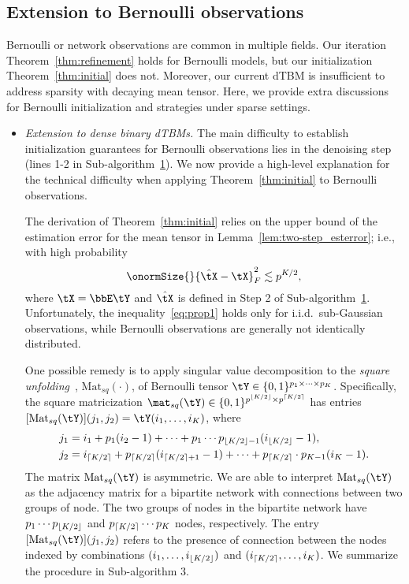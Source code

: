 \documentclass[lettersize,onecolumn,journal]{IEEEtran}
\theoremstyle{definition}
\theoremstyle{definition}
\newcommand{\Mat}{\text{Mat}}
\DeclarePairedDelimiter{\ceil}{\lceil}{\rceil}
\DeclarePairedDelimiter{\floor}{\lfloor}{\rfloor}
\begin{document}
{
  

\subsection{Extension to Bernoulli observations}\label{subsec:ber}

Bernoulli or network observations are common in multiple fields. Our iteration Theorem~\ref{thm:refinement} holds for Bernoulli models, but our initialization Theorem~\ref{thm:initial} does not. Moreover, our current dTBM is insufficient to address sparsity with decaying mean tensor. Here, we provide extra discussions for Bernoulli initialization and strategies under sparse settings.

\begin{itemize}[wide]
    \item \textit{Extension to dense binary dTBMs.} The main difficulty to establish initialization guarantees for Bernoulli observations lies in the denoising step (lines 1-2 in Sub-algorithm~\hyperref[alg:main]{1}). We now provide a high-level explanation for the technical difficulty when applying Theorem~\ref{thm:initial} to Bernoulli observations. 
    
    
    The derivation of Theorem~\ref{thm:initial} relies on the upper bound of the estimation error for the mean tensor in Lemma~\ref{lem:two-step_esterror}; i.e., with high probability
\begin{equation}\label{eq:prop1}
    \onormSize{}{\hat \tX - \tX}_F^2 \lesssim p^{K/2},
\end{equation}
where $\tX = \bbE\tY$ and $\hat \tX$ is defined in Step 2 of Sub-algorithm~\hyperref[alg:main]{1}. Unfortunately, the inequality~\eqref{eq:prop1} holds only for i.i.d.\ sub-Gaussian observations, while Bernoulli observations are generally not identically distributed.  

{
\color{blue}

One possible remedy is to apply singular value decomposition to the \emph{square unfolding}~\citep{mu2014square}, $\Mat_{sq}(\cdot)$, of Bernoulli tensor $\tY \in \{0,1\}^{p_1 \times \cdots \times p_K}$. Specifically, the square matricization $\mat_{sq} (\tY) \in \{0,1\}^{p^{\floor{K/2}} \times p^{\ceil{K/2}} }$ has entries $[\Mat_{sq}(\tY)](j_1, j_2) = \tY(i_1, \ldots, i_K)$, where
\begin{align}
    j_1 &= i_1 + p_1(i_2 - 1) + \cdots + p_1 \cdots p_{\floor{K/2}-1} (i_{\floor{K/2}} - 1),\\
    j_2 &= i_{\ceil{K/2}} + p_{ \ceil{K/2}}(i_{\ceil{K/2} + 1} - 1) + \cdots + p_{ \ceil{K/2}} \cdot p_{K-1} (i_K-1).
\end{align}
The matrix $\Mat_{sq}(\tY)$ is asymmetric. We are able to interpret $\Mat_{sq}(\tY)$ as the adjacency matrix for a bipartite network with connections between two groups of node. The two groups of nodes in the bipartite network have $p_1 \cdots p_{\floor{K/2}}$ and $ p_{\ceil{K/2}} \cdots p_K$ nodes, respectively. The entry $[\Mat_{sq}(\tY)](j_1, j_2)$ refers to the presence of connection between the nodes indexed by combinations $(i_1, \ldots, i_{\floor{K/2}})$ and $(i_{\ceil{K/2}}, \ldots, i_K)$. We summarize the procedure in Sub-algorithm 3.

}
\end{itemize}}
\end{document}
